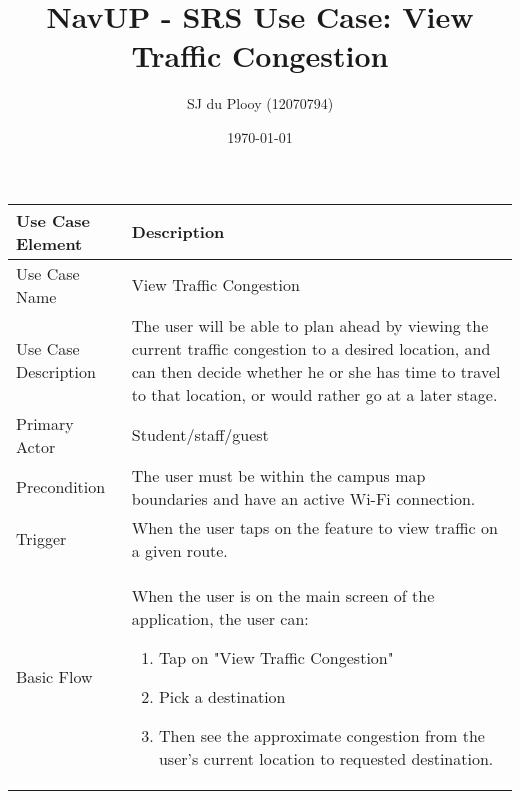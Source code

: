 \documentclass[12pt]{article}
\begin{document}
\title{NavUP - SRS Use Case: View Traffic Congestion}
\author{SJ du Plooy (12070794)}
\date{\today}
\maketitle


\begin{tabular}{|p{4cm}|p{10cm}|}
\hline

Use Case Element & Description \\
\hline

Use Case Name & 
View Traffic Congestion \\
\hline

Use Case Description & 
The user will be able to plan ahead by viewing the current traffic congestion to a desired location, and can then decide whether he or she has time to travel to that location, or would rather go at a later stage.   \\
\hline

Primary Actor & 
Student/staff/guest \\
\hline

Precondition & 
The user must be within the campus map boundaries and have an active Wi-Fi connection.   \\
\hline

Trigger & 
When the user taps on the feature to view traffic on a given route.   \\
\hline

Basic Flow & 
When the user is on the main screen of the application, the user can:
\begin{enumerate}
\item Tap on "View Traffic Congestion"
\item Pick a destination
\item Then see the approximate congestion from the user's current location to requested destination.
\end{enumerate} \\
\hline

\hline
\end{tabular}
\end{document}
